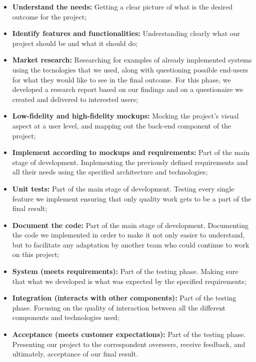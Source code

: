 \documentclass[12pt]{article}
\begin{document}
\begin{itemize}

	\item \textbf{Understand the needs:} Getting a clear picture of what is the desired outcome for the project;
	\item \textbf{Identify features and functionalities:} Understanding clearly what our project should be and what it should do;
	\item \textbf{Market research:} Researching for examples of already implemented systems using the tecnologies that we used, along with
	      questioning possible end-users for what they would like to see in the final outcome. For this phase, we developed a research report based
	      on our findings and on a questionaire we created and delivered to interested users;
	\item \textbf{Low-fidelity and high-fidelity mockups:} Mocking the project's visual aspect at a user level, and mapping out the back-end
	      component of the project;
	\item \textbf{Implement according to mockups and requirements:} Part of the main stage of development. Implementing the
	      previously defined requirements and all their needs using the specified architecture and technologies;
	\item \textbf{Unit tests:} Part of the main stage of development. Testing every single feature we implement ensuring that
	      only quality work gets to be a part of the final result;
	\item \textbf{Document the code:} Part of the main stage of development. Documenting the code we implemented in order to
	      make it not only easier to understand, but to facilitate any adaptation by another team who could continue to work on this project;
	\item \textbf{System (meets requirements):} Part of the testing phase. Making sure that what we developed is what was
	      expected by the specified requirements;
	\item \textbf{Integration (interacts with other components):} Part of the testing phase. Focusing on the quality of interaction
	      between all the different components and technologies used;
	\item \textbf{Acceptance (meets customer expectations):} Part of the testing phase. Presenting our project to the correspondent
	      overseers, receive feedback, and ultimately, acceptance of our final result.
\end{itemize}
\end{document}
